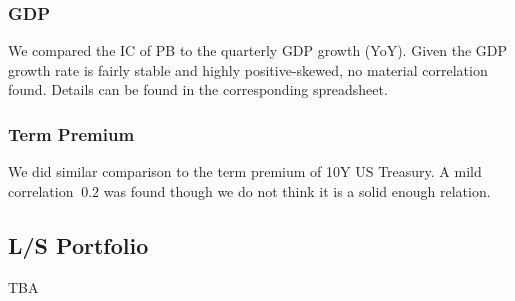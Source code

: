 \documentclass[11pt]{article} %
\begin{document}
\subsubsection{GDP}
We compared the IC of PB to the quarterly GDP growth (YoY). Given the GDP growth rate is fairly stable and highly positive-skewed, no material correlation found. Details can be found in the corresponding spreadsheet.

\subsubsection{Term Premium}
We did similar comparison to the term premium of 10Y US Treasury. A mild correlation $~0.2$ was found though we do not think it is a solid enough relation.

\subsection{L/S Portfolio}
TBA
\end{document}
